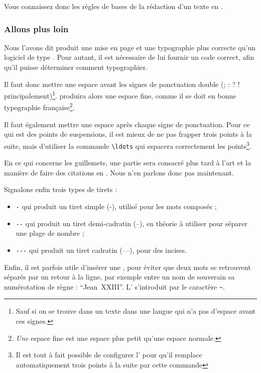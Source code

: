 Vous connaissez donc les règles de bases de la rédaction d'un texte en \logiciel{\LaTex}.

\subsubsection{Allons plus loin}


Nous l'avons dit \logiciel{\LaTex} produit une mise en page et une typographie plus correcte qu'un logiciel de type . Pour autant, il est nécessaire de lui fournir un code correct, afin qu'il puisse déterminer comment typographier.

Il faut donc mettre une espace avant les signes de ponctuation double (; : ? ! principalement)\footnote{Sauf si on se trouve dans un texte dans une langue qui n'a pas d'espace avant ces signes.}. \logiciel{\LaTex} produira alors une espace fine, comme il se doit en bonne typographie fran\c caise\footnote{\emph{Une} espace fine est une espace plus petit qu'une espace normale.}.

Il faut également mettre une espace après chaque signe de ponctuation. Pour ce qui est des points de suspensions, il est mieux de ne pas frapper trois points à la suite, mais d'utiliser la commande \verb|\ldots| qui espacera correctement les points\footnote{Il est tout à fait possible de configurer l' pour qu'il remplace automatiquement trois points à la suite par cette commande}.

En ce qui concerne les guillemets, une partie sera consacré plus tard à l'art et la manière de faire des citations en \logiciel{\LaTex}. Nous n'en parlons donc pas maintenant.

Signalons enfin trois types de tirets :
\begin{itemize}
\item \verb|-| qui produit un tiret simple (-), utilisé pour les mots composés ;
\item \verb|--| qui produit un tiret demi-cadratin (--), en théorie à utiliser pour séparer une plage de nombre ;
\item \verb|---| qui produit un tiret cadratin (---), pour des incises.
\end{itemize}
 
Enfin, il est parfois utile d'insérer une , pour éviter que deux mots se retrouvent séparés par un retour à la ligne, par exemple entre un nom de souverain sa numérotation de règne : \enquote{Jean~XXIII}.  L' s'introduit par le caractère \verb|~|.

